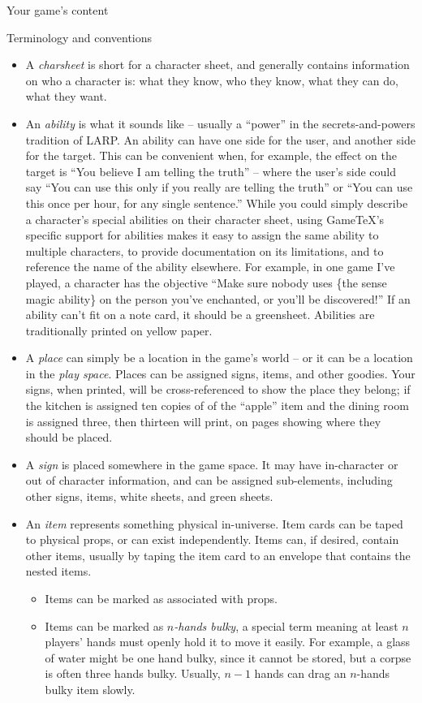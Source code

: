 \documentclass{article}
\newcommand{\gametex}{GameTeX}
\begin{document}
\begin{section}{Your game's content}
\begin{subsection}{Terminology and conventions}
\begin{itemize}
    \item A \textit{charsheet} is short for a character sheet, and generally contains information on who a character is: what they know, who they know, what they can do, what they want.
    \item An \textit{ability} is what it sounds like – usually a ``power'' in the secrets-and-powers tradition of LARP.  An ability can have one side for the user, and another side for the target.  This can be convenient when, for example, the effect on the target is ``You believe I am telling the truth'' -- where the user's side could say ``You can use this only if you really are telling the truth'' or ``You can use this once per hour, for any single sentence.'' While you could simply describe a character's special abilities on their character sheet, using \gametex{}'s specific support for abilities makes it easy to assign the same ability to multiple characters, to provide documentation on its limitations, and to reference the name of the ability elsewhere.  For example, in one game I've played, a character has the objective ``Make sure nobody uses \{the sense magic ability\} on the person you've enchanted, or you'll be discovered!''  If an ability can't fit on a note card, it should be a greensheet.  Abilities are traditionally printed on yellow paper.
    \item A \textit{place} can simply be a location in the game's world -- or it can be a location in the \textit{play space}.  Places can be assigned signs, items, and other goodies.  Your signs, when printed, will be cross-referenced to show the place they belong; if the kitchen is assigned ten copies of of the ``apple'' item and the dining room is assigned three, then thirteen will print, on pages showing where they should be placed.
   \item A \textit{sign} is placed somewhere in the game space.  It may have in-character or out of character information, and can be assigned sub-elements, including other signs, items, white sheets, and green sheets.
  \item An \textit{item} represents something physical in-universe.  Item cards can be taped to physical props, or can exist independently.  Items can, if desired, contain other items, usually by taping the item card to an envelope that contains the nested items.
\begin{itemize}
\item  Items can be marked as associated with props.
\item   Items can be marked as \textit{$n$-hands bulky}, a special term meaning at least $n$ players' hands must openly hold it to move it easily.  For example, a glass of water might be one hand bulky, since it cannot be stored, but a corpse is often three hands bulky.  Usually, $n-1$ hands can drag an $n$-hands bulky item slowly.

\end{itemize}
\end{itemize}
\end{subsection}
\end{section}
\end{document}
